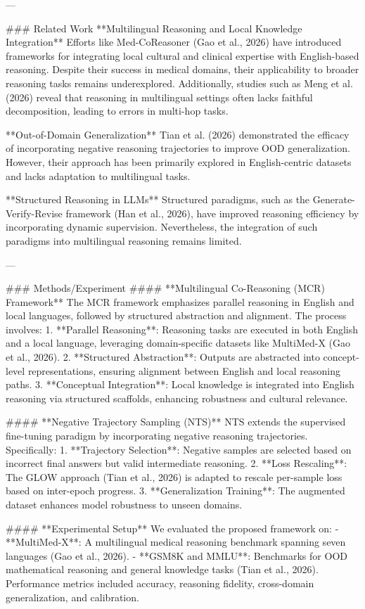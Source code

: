 ---

### Related Work
**Multilingual Reasoning and Local Knowledge Integration**  
Efforts like Med-CoReasoner (Gao et al., 2026) have introduced frameworks for integrating local cultural and clinical expertise with English-based reasoning. Despite their success in medical domains, their applicability to broader reasoning tasks remains underexplored. Additionally, studies such as Meng et al. (2026) reveal that reasoning in multilingual settings often lacks faithful decomposition, leading to errors in multi-hop tasks.

**Out-of-Domain Generalization**  
Tian et al. (2026) demonstrated the efficacy of incorporating negative reasoning trajectories to improve OOD generalization. However, their approach has been primarily explored in English-centric datasets and lacks adaptation to multilingual tasks.

**Structured Reasoning in LLMs**  
Structured paradigms, such as the Generate-Verify-Revise framework (Han et al., 2026), have improved reasoning efficiency by incorporating dynamic supervision. Nevertheless, the integration of such paradigms into multilingual reasoning remains limited.

---

### Methods/Experiment
#### **Multilingual Co-Reasoning (MCR) Framework**
The MCR framework emphasizes parallel reasoning in English and local languages, followed by structured abstraction and alignment. The process involves:
1. **Parallel Reasoning**: Reasoning tasks are executed in both English and a local language, leveraging domain-specific datasets like MultiMed-X (Gao et al., 2026).
2. **Structured Abstraction**: Outputs are abstracted into concept-level representations, ensuring alignment between English and local reasoning paths.
3. **Conceptual Integration**: Local knowledge is integrated into English reasoning via structured scaffolds, enhancing robustness and cultural relevance.

#### **Negative Trajectory Sampling (NTS)**
NTS extends the supervised fine-tuning paradigm by incorporating negative reasoning trajectories. Specifically:
1. **Trajectory Selection**: Negative samples are selected based on incorrect final answers but valid intermediate reasoning.
2. **Loss Rescaling**: The GLOW approach (Tian et al., 2026) is adapted to rescale per-sample loss based on inter-epoch progress.
3. **Generalization Training**: The augmented dataset enhances model robustness to unseen domains.

#### **Experimental Setup**
We evaluated the proposed framework on:
- **MultiMed-X**: A multilingual medical reasoning benchmark spanning seven languages (Gao et al., 2026).
- **GSM8K and MMLU**: Benchmarks for OOD mathematical reasoning and general knowledge tasks (Tian et al., 2026).  
Performance metrics included accuracy, reasoning fidelity, cross-domain generalization, and calibration.


